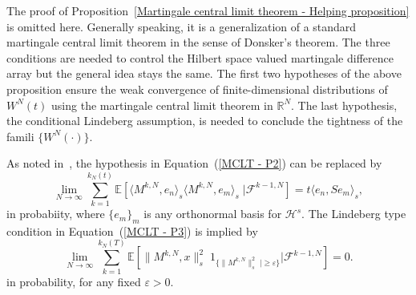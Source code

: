 The proof of Proposition~\ref{Martingale central limit theorem - Helping proposition} is omitted here. Generally speaking, it is a generalization of a standard martingale central limit theorem in the sense of Donsker's theorem. The three conditions are needed to control the Hilbert space valued martingale difference array but the general idea stays the same. The first two hypotheses of the above proposition ensure the weak convergence of finite-dimensional distributions of $ W^{N}(t) $ using the martingale central limit theorem in $ \mathbb{R}^N $. The last hypothesis, the conditional Lindeberg assumption, is needed to conclude the tightness of the famili $ \{ W^{N}(\cdot) \}  $.

\begin{rem}
 As noted in~\autocite{ChenWhite1998}, the hypothesis in Equation~(\ref{MCLT - P2}) can be replaced by
 \begin{equation*}
  \lim_{N \to \infty} \sum_{k=1}^{k_{N}(t)} \mathbb{E} \left[ \langle  M^{k,N} , e_n \rangle_{s} \langle  M^{k,N} , e_m \rangle_{s} \; | \mathcal{F}^{k-1,N} \right] = t \langle e_n , S e_m \rangle_{s}, 
 \end{equation*}
 in probabiity, where $ \{ e_m \}_{m} $ is any orthonormal basis for $ \mathcal{H}^s $. The Lindeberg type condition in Equation~(\ref{MCLT - P3}) is implied by
 \begin{equation*}
  \lim_{N \to \infty} \sum_{k=1}^{k_{N}(T)} \mathbb{E} \left[ \| M^{k,N} , x \|_{s}^{2} \;  1_{\{ \| M^{k,N} \|_{s}^{2} \; | \geq \varepsilon \}} | \mathcal{F}^{k-1,N} \right] = 0. 
 \end{equation*}
 in probability, for any fixed $ \varepsilon > 0 $.

\end{rem}

